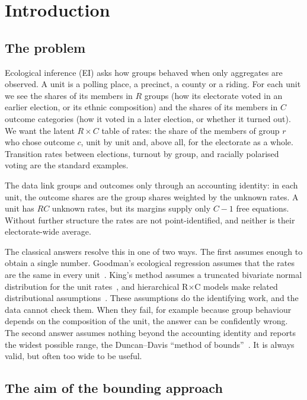 \section{Introduction}\label{sec:intro}

\subsection{The problem}

Ecological inference (EI) asks how groups behaved when only aggregates are
observed. A unit is a polling place, a precinct, a county or a riding. For
each unit we see the shares of its members in $R$ groups (how its electorate
voted in an earlier election, or its ethnic composition) and the shares of its
members in $C$ outcome categories (how it voted in a later election, or whether
it turned out). We want the latent $R\times C$ table of rates: the share of the
members of group $r$ who chose outcome $c$, unit by unit and, above all, for
the electorate as a whole. Transition rates between elections, turnout by
group, and racially polarised voting are the standard examples.

The data link groups and outcomes only through an accounting identity: in each
unit, the outcome shares are the group shares weighted by the unknown rates.
A unit has $RC$ unknown rates, but its margins supply only $C-1$ free
equations. Without further structure the rates are not point-identified, and
neither is their electorate-wide average.

The classical answers resolve this in one of two ways. The first assumes enough
to obtain a single number. Goodman's ecological regression assumes that the
rates are the same in every unit~\citep{goodman1953}. King's method assumes a
truncated bivariate normal distribution for the unit rates~\citep{king1997}, and
hierarchical R$\times$C models make related distributional
assumptions~\citep{rjkt2001,greinerquinn2009}. These assumptions do the
identifying work, and the data cannot check them. When they fail, for example
because group behaviour depends on the composition of the unit, the answer can
be confidently wrong. The second answer assumes nothing beyond the accounting
identity and reports the widest possible range, the Duncan--Davis ``method of
bounds''~\citep{duncan1953}. It is always valid, but often too wide to be
useful.

\subsection{The aim of the bounding approach}

